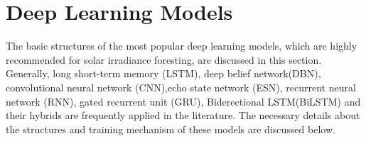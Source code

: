\documentclass[a4paper,fleqn]{cas-sc}
\begin{document}

\section{ Deep Learning Models}
The basic structures of the most popular deep learning models, which are highly recommended for solar irradiance foresting, are discussed in this section. Generally, long short-term memory (LSTM), deep belief network(DBN), convolutional neural network (CNN),echo state network (ESN), recurrent neural network (RNN), gated recurrent unit (GRU), Biderectional LSTM(BiLSTM) and their hybrids are frequently applied in the literature. The necessary details about the structures and training mechanism of these models are discussed below.
\end{document}
